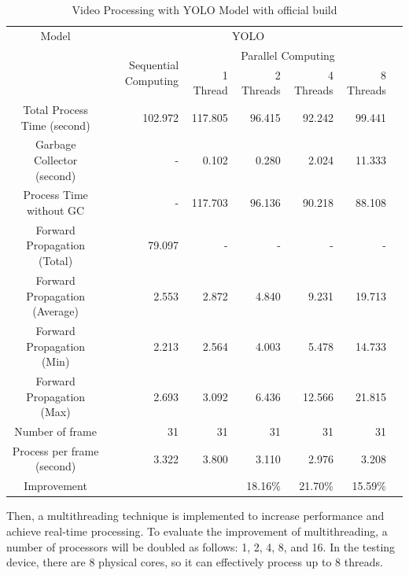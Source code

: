             \begin{table}[!htp]\centering
                \scriptsize
                \begin{tabular}{lrrrrrrr}\toprule
                    \multicolumn{2}{c}{Model} &\multicolumn{5}{c}{YOLO} \\\cmidrule{1-7}
                    \multicolumn{2}{c}{\multirow{2}{*}{}} &\multirow{2}{*}{Sequential Computing} &\multicolumn{4}{c}{Parallel Computing} \\\cmidrule{4-7}
                    & & &1 Thread &2 Threads &4 Threads &8 Threads \\\midrule
                    \multicolumn{2}{c}{Total Process Time (second)} &102.972 &117.805 &96.415 &92.242 &99.441 \\
                    \multicolumn{2}{c}{Garbage Collector (second)} &- &0.102 &0.280 &2.024 &11.333 \\
                    \multicolumn{2}{c}{Process Time without GC} &- &117.703 &96.136 &90.218 &88.108 \\
                    \multicolumn{2}{c}{Forward Propagation (Total)} &79.097 &- &- &- &- \\
                    \multicolumn{2}{c}{Forward Propagation (Average)} &2.553 &2.872 &4.840 &9.231 &19.713 \\
                    \multicolumn{2}{c}{Forward Propagation (Min)} &2.213 &2.564 &4.003 &5.478 &14.733 \\
                    \multicolumn{2}{c}{Forward Propagation (Max)} &2.693 &3.092 &6.436 &12.566 &21.815 \\
                    \multicolumn{2}{c}{Number of frame} &31 &31 &31 &31 &31 \\
                    \multicolumn{2}{c}{Process per frame (second)} &3.322 &3.800 &3.110 &2.976 &3.208 \\
                    \multicolumn{2}{c}{Improvement} & & &18.16\% &21.70\% &15.59\% \\
                    \bottomrule
                \end{tabular}

                \caption{Video Processing with YOLO Model with official build}\label{yolo:official-performace}
            \end{table}

            Then, a multithreading technique is implemented to increase performance and achieve real-time processing.
            To evaluate the improvement of multithreading, a number of processors will be doubled as follows: 1, 2, 4, 8, and 16.
            In the testing device, there are 8 physical cores, so it can effectively process up to 8 threads.

